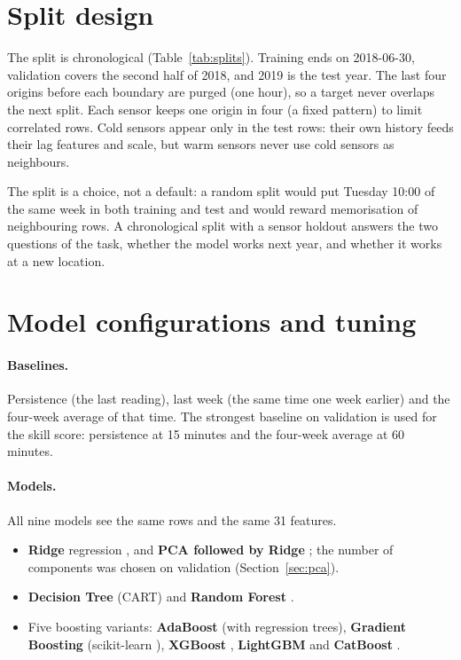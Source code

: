 \documentclass[11pt,a4paper]{article}
\begin{document}
\section{Split design}\label{sec:split}
The split is chronological (Table~\ref{tab:splits}). Training ends on 2018-06-30, validation covers the second half of 2018, and 2019 is the test year. The last four origins before each boundary are purged (one hour),
so a target never overlaps the next split. Each sensor keeps one origin in four (a fixed pattern) to limit correlated rows. Cold sensors appear only in the test rows: their own history feeds their lag features and
scale, but warm sensors never use cold sensors as neighbours.

\begin{table}[H]\centering\small

\caption{Chronological split, 15-minute horizon (the 60-minute table has the same structure).}\label{tab:splits}
\end{table}

The split is a choice, not a default: a random split would put Tuesday 10:00 of the same week in both training and test and would reward memorisation of neighbouring rows. A chronological split with a sensor holdout answers the two questions of the task,
whether the model works next year, and whether it works at a new location.

\section{Model configurations and tuning}
\paragraph{Baselines.} Persistence (the last reading), last week (the same time one week earlier) and the four-week average of that time. The strongest baseline on validation is used for the skill score: persistence at 15 minutes and the
four-week average at 60 minutes.

\paragraph{Models.} All nine models see the same rows and the same 31 features.
\begin{itemize}
\item \textbf{Ridge} regression \cite{ridge}, and \textbf{PCA followed by Ridge} \cite{jolliffe}; the number of components was chosen on validation (Section~\ref{sec:pca}).
\item \textbf{Decision Tree} (CART) \cite{cart} and \textbf{Random Forest} \cite{rf}.
\item Five boosting variants: \textbf{AdaBoost} \cite{adaboost} (with regression trees), \textbf{Gradient Boosting} \cite{gbm} (scikit-learn \cite{sklearn}), \textbf{XGBoost} \cite{xgboost}, \textbf{LightGBM} \cite{lightgbm} and \textbf{CatBoost} \cite{catboost}.
\end{itemize}
\end{document}
